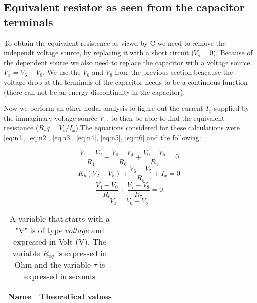 \subsection{Equivalent resistor as seen from the capacitor terminals}
To obtain the equivalent resistence as viewd by C we need to remove the independt voltage source, by replacing it with a short circuit ($V_s=0$). Because of the dependent source we also need to  replace the capacitor with a voltage source $V_x = V_6-V_8$. We use the $V_6$ and $V_8$ from the previous section beacause the voltage drop at the terminals of the capacitor needs to be a continuous function (there can not be an energy
discontinuity in the capacitor).\par
Now we perform an other nodal analysis to figure out the current $I_x$ supplied by the immaginary voltage source $V_x$, to then be able to find the equivalent resistance ($R_eq = V_x/I_x$).The equations considered for these calculations were \ref{eq:n1}, \ref{eq:n2}, \ref{eq:n3}, \ref{eq:n4}, \ref{eq:n5}, \ref{eq:n6} and the following:


\begin {equation}
	\frac{V_1-V_2}{R_1} + \frac{V_0-V_4}{R_6} + \frac{V_0-V_5}{R_4} = 0
	\label{eq:eq7}
\end{equation}
\begin {equation}
	K_b(V_2-V_5) + \frac{V_6-V_5}{R_5} + I_x  = 0
	\label{eq:eq8}
\end{equation}
\begin {equation}
	\frac{V_4-V_0}{R_6} + \frac{V_7 - V_8}{R_7} = 0
	\label{eq:eq9}
\end{equation}
\begin {equation}
	V_x = V_6 - V_8
	\label{eq:eq10}
\end{equation}
\newpage

\begin{table}[H]

  \centering
  \begin{tabular}{|l|r|}
    \hline    
    {\bf Name} & {\bf Theoretical values }\\ \hline
    
  \end{tabular}
  \vspace{10px}
  \caption{A variable that starts with a "V" is of type {\it voltage} and expressed in
    Volt (V). The variable $R_{eq}$ is expressed in Ohm and the variable $\tau$ is expressed in seconds }
  \label{tab:equivalent resistor}
\end{table}

